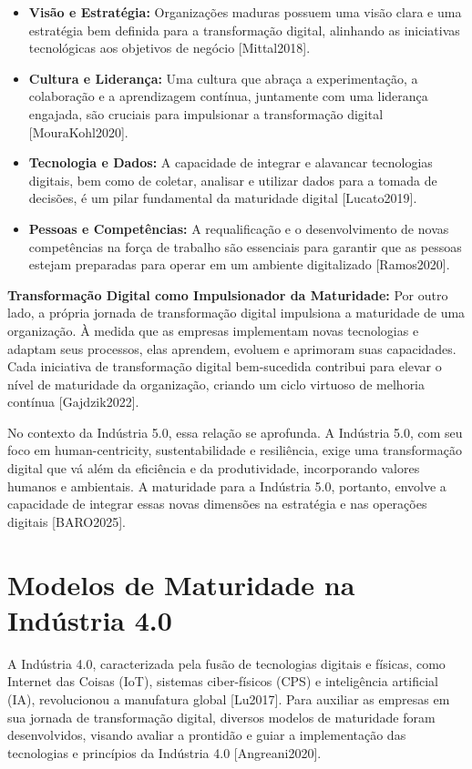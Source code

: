\begin{itemize}
    \item \textbf{Visão e Estratégia:} Organizações maduras possuem uma visão clara e uma estratégia bem definida para a transformação digital, alinhando as iniciativas tecnológicas aos objetivos de negócio [Mittal2018].
    \item \textbf{Cultura e Liderança:} Uma cultura que abraça a experimentação, a colaboração e a aprendizagem contínua, juntamente com uma liderança engajada, são cruciais para impulsionar a transformação digital [MouraKohl2020].
    \item \textbf{Tecnologia e Dados:} A capacidade de integrar e alavancar tecnologias digitais, bem como de coletar, analisar e utilizar dados para a tomada de decisões, é um pilar fundamental da maturidade digital [Lucato2019].
    \item \textbf{Pessoas e Competências:} A requalificação e o desenvolvimento de novas competências na força de trabalho são essenciais para garantir que as pessoas estejam preparadas para operar em um ambiente digitalizado [Ramos2020].
\end{itemize}

\textbf{Transformação Digital como Impulsionador da Maturidade:}
Por outro lado, a própria jornada de transformação digital impulsiona a maturidade de uma organização. À medida que as empresas implementam novas tecnologias e adaptam seus processos, elas aprendem, evoluem e aprimoram suas capacidades. Cada iniciativa de transformação digital bem-sucedida contribui para elevar o nível de maturidade da organização, criando um ciclo virtuoso de melhoria contínua [Gajdzik2022].

No contexto da Indústria 5.0, essa relação se aprofunda. A Indústria 5.0, com seu foco em human-centricity, sustentabilidade e resiliência, exige uma transformação digital que vá além da eficiência e da produtividade, incorporando valores humanos e ambientais. A maturidade para a Indústria 5.0, portanto, envolve a capacidade de integrar essas novas dimensões na estratégia e nas operações digitais [BARO2025].





\section{Modelos de Maturidade na Indústria 4.0}

A Indústria 4.0, caracterizada pela fusão de tecnologias digitais e físicas, como Internet das Coisas (IoT), sistemas ciber-físicos (CPS) e inteligência artificial (IA), revolucionou a manufatura global [Lu2017]. Para auxiliar as empresas em sua jornada de transformação digital, diversos modelos de maturidade foram desenvolvidos, visando avaliar a prontidão e guiar a implementação das tecnologias e princípios da Indústria 4.0 [Angreani2020].


